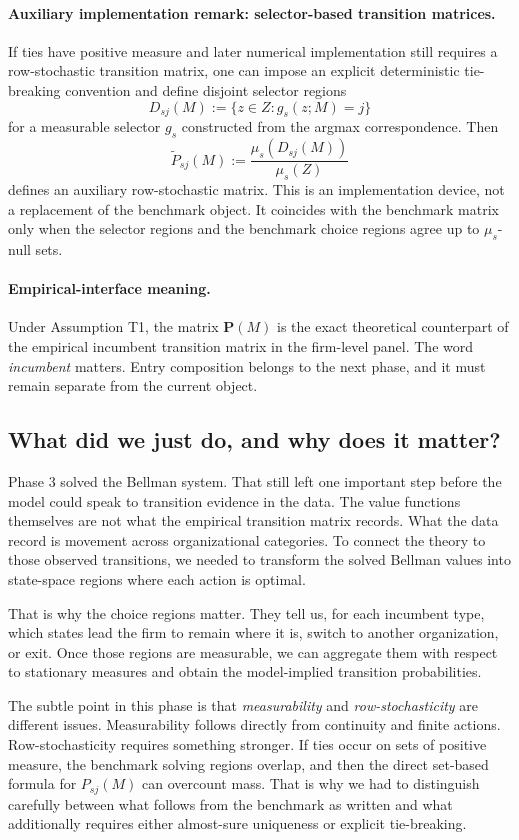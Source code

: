 \paragraph{Auxiliary implementation remark: selector-based transition matrices.}
If ties have positive measure and later numerical implementation still requires a row-stochastic transition matrix, one can impose an explicit deterministic tie-breaking convention and define disjoint selector regions
\[
D_{sj}(M):=\{z\in Z:g_s(z;M)=j\}
\]
for a measurable selector $g_s$ constructed from the argmax correspondence. Then
\[
\widetilde P_{sj}(M):=\frac{\mu_s(D_{sj}(M))}{\mu_s(Z)}
\]
defines an auxiliary row-stochastic matrix. This is an implementation device, not a replacement of the benchmark object. It coincides with the benchmark matrix only when the selector regions and the benchmark choice regions agree up to $\mu_s$-null sets.

\paragraph{Empirical-interface meaning.}
Under Assumption T1, the matrix $\mathbf P(M)$ is the exact theoretical counterpart of the empirical incumbent transition matrix in the firm-level panel. The word \emph{incumbent} matters. Entry composition belongs to the next phase, and it must remain separate from the current object.

\subsection{What did we just do, and why does it matter?}

Phase 3 solved the Bellman system. That still left one important step before the model could speak to transition evidence in the data. The value functions themselves are not what the empirical transition matrix records. What the data record is movement across organizational categories. To connect the theory to those observed transitions, we needed to transform the solved Bellman values into state-space regions where each action is optimal.

That is why the choice regions matter. They tell us, for each incumbent type, which states lead the firm to remain where it is, switch to another organization, or exit. Once those regions are measurable, we can aggregate them with respect to stationary measures and obtain the model-implied transition probabilities.

The subtle point in this phase is that \emph{measurability} and \emph{row-stochasticity} are different issues. Measurability follows directly from continuity and finite actions. Row-stochasticity requires something stronger. If ties occur on sets of positive measure, the benchmark solving regions overlap, and then the direct set-based formula for $P_{sj}(M)$ can overcount mass. That is why we had to distinguish carefully between what follows from the benchmark as written and what additionally requires either almost-sure uniqueness or explicit tie-breaking.

